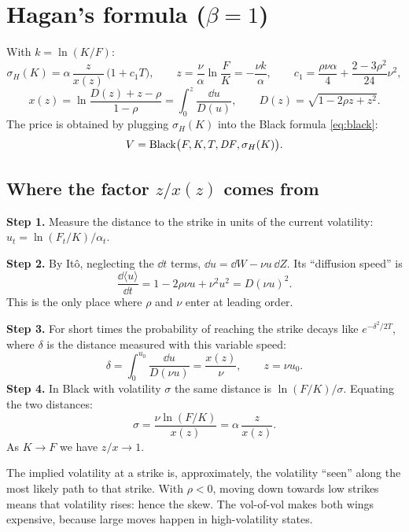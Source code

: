 \section{\texorpdfstring{Hagan's formula ($\beta=1$)}{Hagan's formula (β=1)}}
With $k=\ln(K/F)$:
\begin{equation}\label{eq:hagan}
\boxed{\sigma_H(K)=\alpha\,\frac{z}{x(z)}\,\big(1+c_1T\big)},\qquad z=\frac\nu\alpha\ln\frac FK=-\frac{\nu k}{\alpha},\qquad
c_1=\frac{\rho\nu\alpha}4+\frac{2-3\rho^2}{24}\nu^2,
\end{equation}
\begin{equation}\label{eq:hagan-x}
x(z)=\ln\frac{D(z)+z-\rho}{1-\rho}=\int_0^z\frac{\dd u}{D(u)},\qquad D(z)=\sqrt{1-2\rho z+z^2}.
\end{equation}
The price is obtained by plugging $\sigma_H(K)$ into the Black formula \eqref{eq:black}:
\[
V=\mathrm{Black}\big(F,K,T,\mathit{DF},\sigma_H(K)\big).
\]

\subsection{\texorpdfstring{Where the factor $z/x(z)$ comes from}{Where the factor z/x(z) comes from}}
\noindent\textbf{Step 1.} Measure the distance to the strike in units of the current volatility:
$u_t=\ln(F_t/K)/\alpha_t$.

\noindent\textbf{Step 2.} By Itô, neglecting the $\dd t$ terms, $\dd u=\dd W-\nu u\,\dd Z$. Its ``diffusion speed''
is
\[
\frac{\dd\langle u\rangle}{\dd t}=1-2\rho\nu u+\nu^2u^2=D(\nu u)^2 .
\]
This is the only place where $\rho$ and $\nu$ enter at leading order.

\noindent\textbf{Step 3.} For short times the probability of reaching the strike decays like $e^{-\delta^2/2T}$,
where $\delta$ is the distance measured with this variable speed:
\[
\delta=\int_0^{u_0}\frac{\dd u}{D(\nu u)}=\frac{x(z)}{\nu},\qquad z=\nu u_0 .
\]
\noindent\textbf{Step 4.} In Black with volatility $\sigma$ the same distance is $\ln(F/K)/\sigma$. Equating the two
distances:
\[
\sigma=\frac{\nu\ln(F/K)}{x(z)}=\alpha\,\frac{z}{x(z)} .
\]
As $K\to F$ we have $z/x\to1$.

\begin{idea}
The implied volatility at a strike is, approximately, the volatility ``seen'' along the most likely path to that
strike. With $\rho<0$, moving down towards low strikes means that volatility rises: hence the skew. The vol-of-vol
makes both wings expensive, because large moves happen in high-volatility states.
\end{idea}

